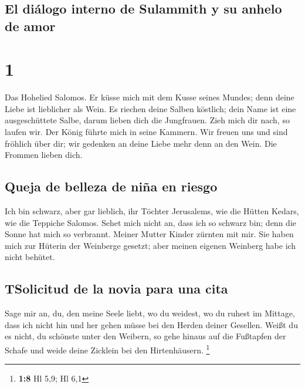 \hypertarget{el-diuxe1logo-interno-de-sulammith-y-su-anhelo-de-amor}{%
\subsection{El diálogo interno de Sulammith y su anhelo de
amor}\label{el-diuxe1logo-interno-de-sulammith-y-su-anhelo-de-amor}}

\hypertarget{section}{%
\section{1}\label{section}}

 Das Hohelied Salomos.  Er küsse mich mit
dem Kusse seines Mundes; denn deine Liebe ist lieblicher als Wein.
 Es riechen deine Salben köstlich; dein Name ist eine
ausgeschüttete Salbe, darum lieben dich die Jungfrauen. 
Zieh mich dir nach, so laufen wir. Der König führte mich in seine
Kammern. Wir freuen uns und sind fröhlich über dir; wir gedenken an
deine Liebe mehr denn an den Wein. Die Frommen lieben dich.

\hypertarget{queja-de-belleza-de-niuxf1a-en-riesgo}{%
\subsection{Queja de belleza de niña en
riesgo}\label{queja-de-belleza-de-niuxf1a-en-riesgo}}

 Ich bin schwarz, aber gar lieblich, ihr Töchter
Jerusalems, wie die Hütten Kedars, wie die Teppiche Salomos.
 Sehet mich nicht an, dass ich so schwarz bin; denn die
Sonne hat mich so verbrannt. Meiner Mutter Kinder zürnten mit mir. Sie
haben mich zur Hüterin der Weinberge gesetzt; aber meinen eigenen
Weinberg habe ich nicht behütet.

\hypertarget{tsolicitud-de-la-novia-para-una-cita}{%
\subsection{TSolicitud de la novia para una
cita}\label{tsolicitud-de-la-novia-para-una-cita}}

 Sage mir an, du, den meine Seele liebt, wo du weidest, wo
du ruhest im Mittage, dass ich nicht hin und her gehen müsse bei den
Herden deiner Gesellen.  Weißt du es nicht, du schönste
unter den Weibern, so gehe hinaus auf die Fußtapfen der Schafe und weide
deine Zicklein bei den Hirtenhäusern. \footnote{\textbf{1:8} Hl 5,9; Hl
  6,1}


